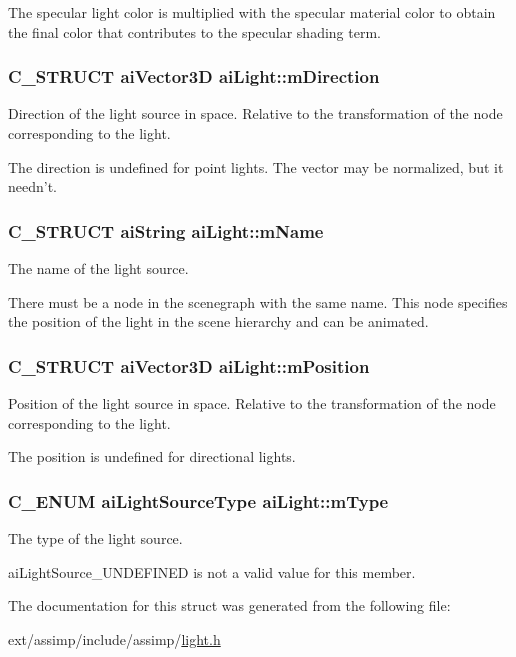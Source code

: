 The specular light color is multiplied with the specular material color to obtain the final color that contributes to the specular shading term. \hypertarget{structai_light_af3776d5e4e6065cb6dd7e10dc656dada}{
\subsubsection[{m\-Direction}]{\setlength{\rightskip}{0pt plus 5cm}C\-\_\-\-S\-T\-R\-U\-C\-T {\bf ai\-Vector3\-D} ai\-Light\-::m\-Direction}}\label{structai_light_af3776d5e4e6065cb6dd7e10dc656dada}
Direction of the light source in space. Relative to the transformation of the node corresponding to the light.

The direction is undefined for point lights. The vector may be normalized, but it needn't. \hypertarget{structai_light_a92806413f16230728b04e5f379fd00c0}{
\subsubsection[{m\-Name}]{\setlength{\rightskip}{0pt plus 5cm}C\-\_\-\-S\-T\-R\-U\-C\-T {\bf ai\-String} ai\-Light\-::m\-Name}}\label{structai_light_a92806413f16230728b04e5f379fd00c0}
The name of the light source.

There must be a node in the scenegraph with the same name. This node specifies the position of the light in the scene hierarchy and can be animated. \hypertarget{structai_light_a5daf9c9ad2613603b847a527123611f0}{
\subsubsection[{m\-Position}]{\setlength{\rightskip}{0pt plus 5cm}C\-\_\-\-S\-T\-R\-U\-C\-T {\bf ai\-Vector3\-D} ai\-Light\-::m\-Position}}\label{structai_light_a5daf9c9ad2613603b847a527123611f0}
Position of the light source in space. Relative to the transformation of the node corresponding to the light.

The position is undefined for directional lights. \hypertarget{structai_light_a4cba1741875dd92724ff55be91c60c2b}{
\subsubsection[{m\-Type}]{\setlength{\rightskip}{0pt plus 5cm}C\-\_\-\-E\-N\-U\-M {\bf ai\-Light\-Source\-Type} ai\-Light\-::m\-Type}}\label{structai_light_a4cba1741875dd92724ff55be91c60c2b}
The type of the light source.

ai\-Light\-Source\-\_\-\-U\-N\-D\-E\-F\-I\-N\-E\-D is not a valid value for this member. 

The documentation for this struct was generated from the following file\-:\begin{DoxyCompactItemize}
\item 
ext/assimp/include/assimp/\hyperlink{light_8h}{light.\-h}\end{DoxyCompactItemize}
